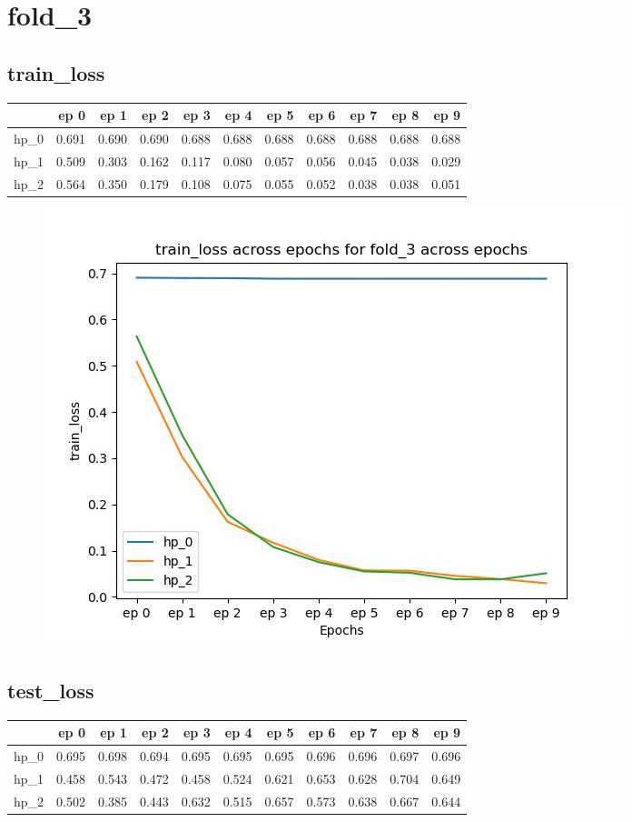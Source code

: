 \documentclass{article}
\begin{document}
\section{fold\_3}
\subsection{train\_loss}
\begin{tabular}{lrrrrrrrrrr}
\toprule
{} &   ep 0 &   ep 1 &   ep 2 &   ep 3 &   ep 4 &   ep 5 &   ep 6 &   ep 7 &   ep 8 &   ep 9 \\
\midrule
hp\_0 &  0.691 &  0.690 &  0.690 &  0.688 &  0.688 &  0.688 &  0.688 &  0.688 &  0.688 &  0.688 \\
hp\_1 &  0.509 &  0.303 &  0.162 &  0.117 &  0.080 &  0.057 &  0.056 &  0.045 &  0.038 &  0.029 \\
hp\_2 &  0.564 &  0.350 &  0.179 &  0.108 &  0.075 &  0.055 &  0.052 &  0.038 &  0.038 &  0.051 \\
\bottomrule
\end{tabular}

\begin{figure}[H]
\includegraphics[scale = 0.75]{fold_3/train_loss}
\end{figure}
\subsection{test\_loss}
\begin{tabular}{lrrrrrrrrrr}
\toprule
{} &   ep 0 &   ep 1 &   ep 2 &   ep 3 &   ep 4 &   ep 5 &   ep 6 &   ep 7 &   ep 8 &   ep 9 \\
\midrule
hp\_0 &  0.695 &  0.698 &  0.694 &  0.695 &  0.695 &  0.695 &  0.696 &  0.696 &  0.697 &  0.696 \\
hp\_1 &  0.458 &  0.543 &  0.472 &  0.458 &  0.524 &  0.621 &  0.653 &  0.628 &  0.704 &  0.649 \\
hp\_2 &  0.502 &  0.385 &  0.443 &  0.632 &  0.515 &  0.657 &  0.573 &  0.638 &  0.667 &  0.644 \\
\bottomrule
\end{tabular}
\end{document}
